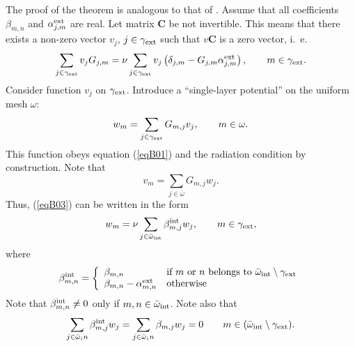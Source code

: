 \documentclass[12pt]{article}
\newcommand{\rin}{{\rm int}}
\newcommand{\rex}{{\rm ext}}
\newcommand{\C}{\mathbf{C}}
\begin{document}
The proof of the theorem is analogous to that of \cite{poblet-PVS:2014}.
Assume that all coefficients $\beta_{m,n}$ and $\alpha_{j,m}^\rex$ are real.
Let matrix $\C$ be not invertible.
This means that there exists a non-zero vector $v_j$, $j \in \gamma_\rex$ such that $v \C$ is a zero vector,
i.\ e.
\begin{equation}
\sum_{j \in \gamma_\rex} v_j G_{j,m} = \nu \sum_{j \in \gamma_\rex} v_j
\left(
\delta_{j,m} - G_{j,m} \alpha_{j,m}^\rex
\right)
,
\qquad
m \in \gamma_\rex.
\label{eqB03}
\end{equation}
Consider function $v_j$ on  $\gamma_\rex$. Introduce a ``single-layer potential''
on the uniform mesh $\omega$:
\begin{equation}
w_m = \sum_{j \in \gamma_\rex} G_{m,j} v_j,
\qquad
m \in \omega.
\label{eqB04}
\end{equation}
This function obeys equation (\ref{eqB01}) and the radiation condition by construction.
Note that
\begin{equation}
v_m = \sum_{j \in \bar \omega} G_{m,j} w_j.
\label{eqB05}
\end{equation}
Thus, (\ref{eqB03}) can be written in the form
\begin{equation}
w_m = \nu \sum_{j \in \bar \omega_\rin} \beta^\rin_{m,j} w_j,
\qquad
m \in \gamma_\rex,
\label{eqB06}
\end{equation}
where
\begin{equation}
\beta_{m,n}^\rin =
\left\{ \begin{array}{ll}
\beta_{m,n} & \mbox{if } m \mbox{ or } n \mbox{ belongs to }\bar \omega_\rin \setminus \gamma_\rex \\
\beta_{m,n} - \alpha_{m,n}^\rex & \mbox{otherwise}
\end{array} \right.
\label{eqB07}
\end{equation}
Note that
$\beta^\rin_{m,n} \ne 0$ only if $m,n \in \bar \omega_\rin$.
Note also that
\begin{equation}
 \sum_{j \in \bar \omega_in} \beta^\rin_{m,j} w_j =
 \sum_{j \in \bar \omega_in} \beta_{m,j} w_j = 0
\qquad
m \in (\bar \omega_\rin \setminus \gamma_\rex).
\label{eqB08}
\end{equation}
\end{document}
